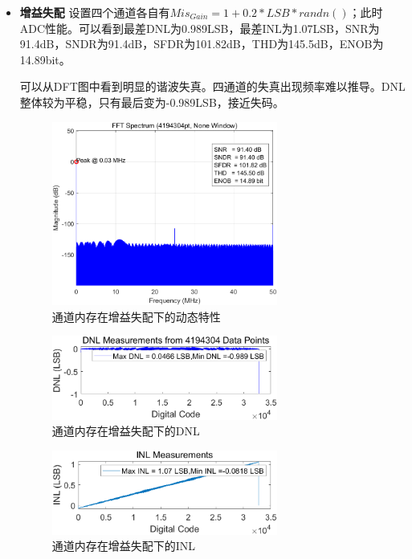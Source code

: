 \documentclass[cs4size,a4paper]{ctexart}
\numberwithin{equation}{section}
\numberwithin{table}{section}
\numberwithin{figure}{section}
\begin{document}
\begin{itemize}
		\item \textbf{增益失配} 设置四个通道各自有$Mis_{Gain} = 1 + 0.2 * LSB * randn()$；此时ADC性能。可以看到最差DNL为0.989LSB，最差INL为1.07LSB，SNR为91.4dB，SNDR为91.4dB，SFDR为101.82dB，THD为145.5dB，ENOB为14.89bit。
		
		可以从DFT图中看到明显的谐波失真。四通道的失真出现频率难以推导。DNL整体较为平稳，只有最后变为-0.989LSB，接近失码。
		\begin{figure}[H]
			\centering
			\includegraphics[width=0.7\textwidth]{pic/TIG/DFT.png}
			\caption{通道内存在增益失配下的动态特性} 
		\end{figure}

		\begin{figure}[H]
			\centering
			\includegraphics[width=0.7\textwidth]{pic/TIG/DNL.png}
			\caption{通道内存在增益失配下的DNL} 
		\end{figure}

		\begin{figure}[H]
			\centering
			\includegraphics[width=0.7\textwidth]{pic/TIG/INL.png}
			\caption{通道内存在增益失配下的INL} 
		\end{figure}


\end{itemize}
\end{document}
